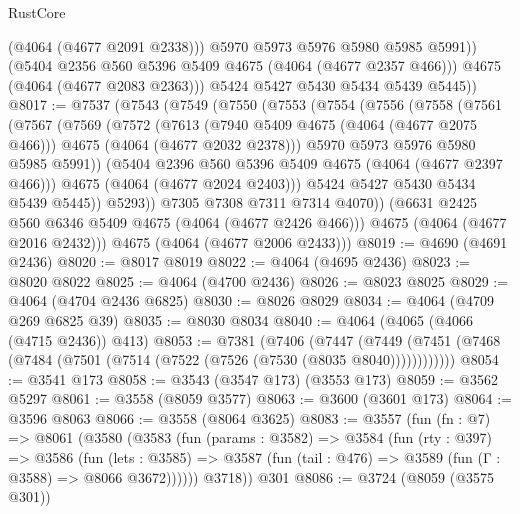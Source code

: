 \begin{lexlean}{RustCore}
\begin{coremodule}
                (@4064 (@4677 @2091 @2338)))
              @5970
              @5973
              @5976
              @5980
              @5985
              @5991))
          (@5404 @2356 @560 @5396 @5409 @4675 (@4064 (@4677 @2357 @466)))
          @4675
          (@4064 (@4677 @2083 @2363)))
        @5424
        @5427
        @5430
        @5434
        @5439
        @5445))
@8017 := @7537
    (@7543
      (@7549
        (@7550
          (@7553
            (@7554
              (@7556
                (@7558
                  (@7561
                    (@7567
                      (@7569
                        (@7572
                          (@7613
                            (@7940 @5409 @4675 (@4064 (@4677 @2075 @466)))
                            @4675
                            (@4064 (@4677 @2032 @2378)))
                          @5970
                          @5973
                          @5976
                          @5980
                          @5985
                          @5991))
                      (@5404 @2396 @560 @5396 @5409 @4675 (@4064 (@4677 @2397 @466)))
                      @4675
                      (@4064 (@4677 @2024 @2403)))
                    @5424
                    @5427
                    @5430
                    @5434
                    @5439
                    @5445))
                @5293))
            @7305
            @7308
            @7311
            @7314
            @4070))
        (@6631 @2425 @560 @6346 @5409 @4675 (@4064 (@4677 @2426 @466)))
        @4675
        (@4064 (@4677 @2016 @2432)))
      @4675
      (@4064 (@4677 @2006 @2433)))
@8019 := @4690 (@4691 @2436)
@8020 := @8017 @8019
@8022 := @4064 (@4695 @2436)
@8023 := @8020 @8022
@8025 := @4064 (@4700 @2436)
@8026 := @8023 @8025
@8029 := @4064 (@4704 @2436 @6825)
@8030 := @8026 @8029
@8034 := @4064 (@4709 @269 @6825 @39)
@8035 := @8030 @8034
@8040 := @4064 (@4065 (@4066 (@4715 @2436)) @413)
@8053 := @7381
    (@7406
      (@7447 (@7449 (@7451 (@7468 (@7484 (@7501 (@7514 (@7522 (@7526 (@7530 (@8035 @8040))))))))))))
@8054 := @3541 @173
@8058 := @3543 (@3547 @173) (@3553 @173)
@8059 := @3562 @5297
@8061 := @3558 (@8059 @3577)
@8063 := @3600 (@3601 @173)
@8064 := @3596 @8063
@8066 := @3558 (@8064 @3625)
@8083 := @3557
    (fun (fn : @7) =>
    @8061
      (@3580
        (@3583
          (fun (params : @3582) =>
          @3584
            (fun (rty : @397) =>
            @3586
              (fun (lets : @3585) =>
              @3587 (fun (tail : @476) => @3589 (fun (Γ : @3588) => @8066 @3672))))))
        @3718))
    @301
@8086 := @3724 (@8059 (@3575 @301))

\end{coremodule}
\end{lexlean}
